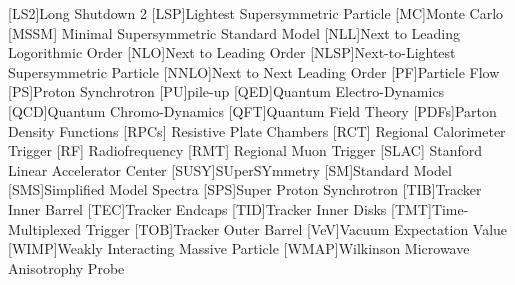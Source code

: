 \begin{acronym}[AAAAAAA]
[LS2]{Long Shutdown 2}
[LSP]{Lightest Supersymmetric Particle}
[MC]{Monte Carlo}
 [MSSM] {Minimal Supersymmetric Standard Model}
[NLL]{Next to Leading Logorithmic Order}
[NLO]{Next to Leading Order}
[NLSP]{Next-to-Lightest Supersymmetric Particle}
[NNLO]{Next to Next Leading Order}
[PF]{Particle Flow}
[PS]{Proton Synchrotron}
[PU]{pile-up}
[QED]{Quantum Electro-Dynamics}
[QCD]{Quantum Chromo-Dynamics}
[QFT]{Quantum Field Theory}
[PDFs]{Parton Density Functions}
 [RPCs] {Resistive Plate Chambers}
 [RCT] {Regional Calorimeter Trigger}
 [RF] {Radiofrequency}
 [RMT] {Regional Muon Trigger}
 [SLAC] {Stanford Linear Accelerator Center}
[SUSY]{SUperSYmmetry}
[SM]{Standard Model}
[SMS]{Simplified Model Spectra}
[SPS]{Super Proton Synchrotron}
[TIB]{Tracker Inner Barrel} 
[TEC]{Tracker Endcaps} 
[TID]{Tracker Inner Disks}
[TMT]{Time-Multiplexed Trigger}
[TOB]{Tracker Outer Barrel} 
[VeV]{Vacuum Expectation Value}
[WIMP]{Weakly Interacting Massive Particle}
[WMAP]{Wilkinson Microwave Anisotrophy Probe}

\end{acronym}

